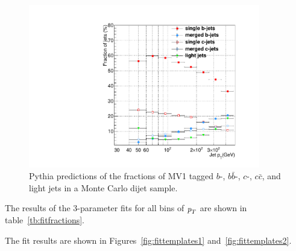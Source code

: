 \begin{figure}[tp]
\centering
\includegraphics[width=0.9\textwidth]{TrueFractions_NominalPythia.pdf}
\caption{Pythia predictions of the fractions of MV1 tagged $b$-, $b\bar{b}$-, $c$-, $c\bar{c}$, and light jets in a Monte Carlo dijet sample.}
\label{fig:truefractions}
\end{figure}




The results of the 3-parameter fits for all bins of ${\emph{p}_{T}}$ are shown in table~\ref{tb:fitfractions}.

The fit results are shown in Figures~\ref{fig:fittemplates1} and~\ref{fig:fittemplates2}.



